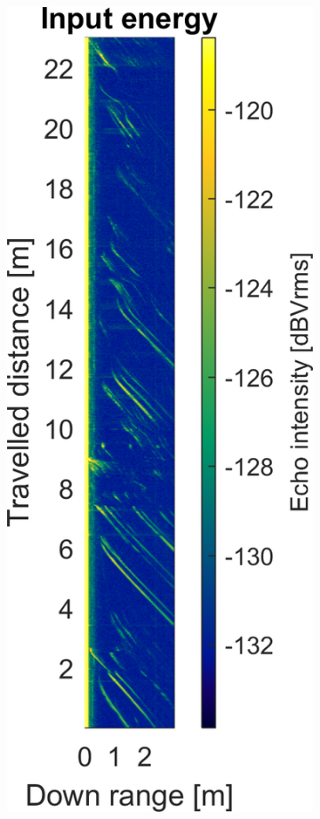 \begin{figure}[htbp]
    \centering
    \begin{subfigure}[t]{0.475\linewidth}
        \centering
        \includegraphics[width=\linewidth,max height=.475\textheight]{gfx/results/sauna_input.png}

\end{subfigure}
\end{figure}
